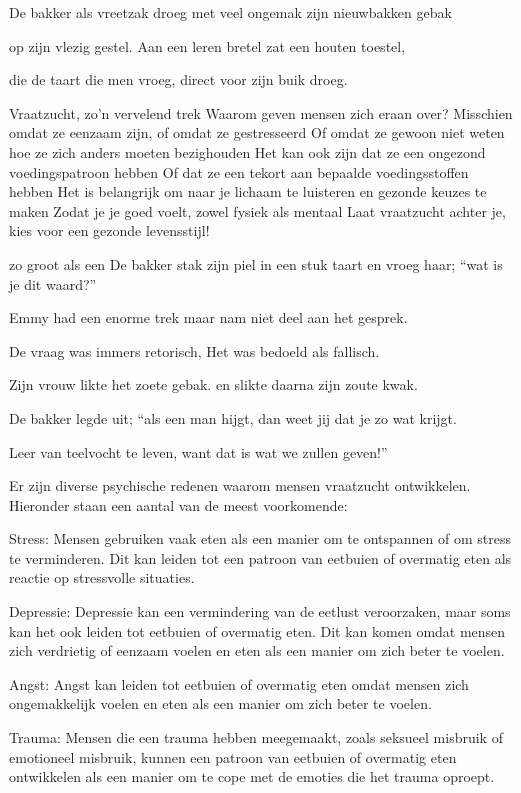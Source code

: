 De bakker als vreetzak
droeg met veel ongemak
zijn nieuwbakken gebak

op zijn vlezig gestel.
Aan een leren bretel
zat een houten toestel,

die de taart die men vroeg,
direct voor zijn buik droeg.

Vraatzucht, zo'n vervelend trek
Waarom geven mensen zich eraan over?
Misschien omdat ze eenzaam zijn, of omdat ze gestresseerd
Of omdat ze gewoon niet weten hoe ze zich anders moeten bezighouden
Het kan ook zijn dat ze een ongezond voedingspatroon hebben
Of dat ze een tekort aan bepaalde voedingsstoffen hebben
Het is belangrijk om naar je lichaam te luisteren en gezonde keuzes te maken
Zodat je je goed voelt, zowel fysiek als mentaal
Laat vraatzucht achter je, kies voor een gezonde levensstijl!

zo groot als een
De bakker stak zijn piel in een stuk taart
en vroeg haar; “wat is je dit waard?”

Emmy had een enorme trek
maar nam niet deel aan het gesprek.

De vraag was immers retorisch,
Het was bedoeld als fallisch.

Zijn vrouw likte het zoete gebak.
en slikte daarna zijn zoute kwak.

De bakker legde uit; “als een man hijgt,
dan weet jij dat je zo wat krijgt.

Leer van teelvocht te leven,
want dat is wat we zullen geven!”

Er zijn diverse psychische redenen waarom mensen vraatzucht ontwikkelen. Hieronder staan een aantal van de meest voorkomende:

Stress: Mensen gebruiken vaak eten als een manier om te ontspannen of om stress te verminderen. Dit kan leiden tot een patroon van eetbuien of overmatig eten als reactie op stressvolle situaties.

Depressie: Depressie kan een vermindering van de eetlust veroorzaken, maar soms kan het ook leiden tot eetbuien of overmatig eten. Dit kan komen omdat mensen zich verdrietig of eenzaam voelen en eten als een manier om zich beter te voelen.

Angst: Angst kan leiden tot eetbuien of overmatig eten omdat mensen zich ongemakkelijk voelen en eten als een manier om zich beter te voelen.

Trauma: Mensen die een trauma hebben meegemaakt, zoals seksueel misbruik of emotioneel misbruik, kunnen een patroon van eetbuien of overmatig eten ontwikkelen als een manier om te cope met de emoties die het trauma oproept.

